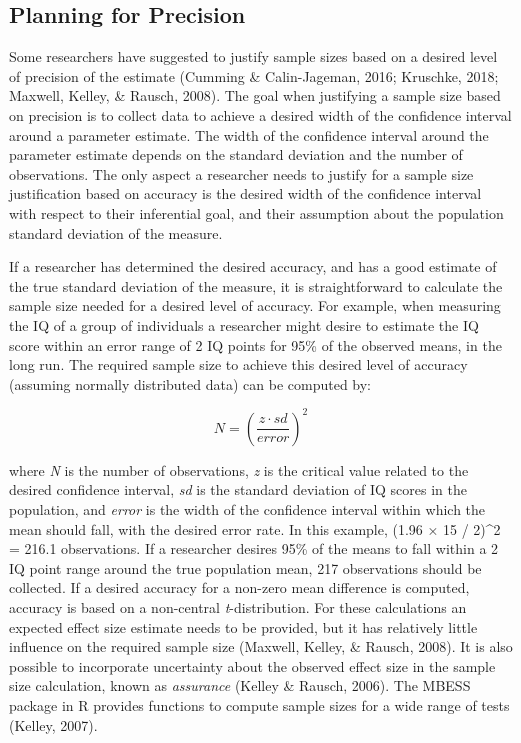 \documentclass[
  english,
  ,jou,floatsintext]{apa6}
\begin{document}
\hypertarget{planning-for-precision}{%
\subsection{Planning for Precision}\label{planning-for-precision}}

Some researchers have suggested to justify sample sizes based on a desired level of precision of the estimate (Cumming \& Calin-Jageman, 2016; Kruschke, 2018; Maxwell, Kelley, \& Rausch, 2008). The goal when justifying a sample size based on precision is to collect data to achieve a desired width of the confidence interval around a parameter estimate. The width of the confidence interval around the parameter estimate depends on the standard deviation and the number of observations. The only aspect a researcher needs to justify for a sample size justification based on accuracy is the desired width of the confidence interval with respect to their inferential goal, and their assumption about the population standard deviation of the measure.

If a researcher has determined the desired accuracy, and has a good estimate of the true standard deviation of the measure, it is straightforward to calculate the sample size needed for a desired level of accuracy. For example, when measuring the IQ of a group of individuals a researcher might desire to estimate the IQ score within an error range of 2 IQ points for 95\% of the observed means, in the long run. The required sample size to achieve this desired level of accuracy (assuming normally distributed data) can be computed by:

\[N = \left(\frac{z \cdot sd}{error}\right)^2\]

where \emph{N} is the number of observations, \emph{z} is the critical value related to the desired confidence interval, \emph{sd} is the standard deviation of IQ scores in the population, and \emph{error} is the width of the confidence interval within which the mean should fall, with the desired error rate. In this example, (1.96 × 15 / 2)\^{}2 = 216.1 observations. If a researcher desires 95\% of the means to fall within a 2 IQ point range around the true population mean, 217 observations should be collected. If a desired accuracy for a non-zero mean difference is computed, accuracy is based on a non-central \emph{t}-distribution. For these calculations an expected effect size estimate needs to be provided, but it has relatively little influence on the required sample size (Maxwell, Kelley, \& Rausch, 2008). It is also possible to incorporate uncertainty about the observed effect size in the sample size calculation, known as \emph{assurance} (Kelley \& Rausch, 2006). The MBESS package in R provides functions to compute sample sizes for a wide range of tests (Kelley, 2007).
\end{document}
